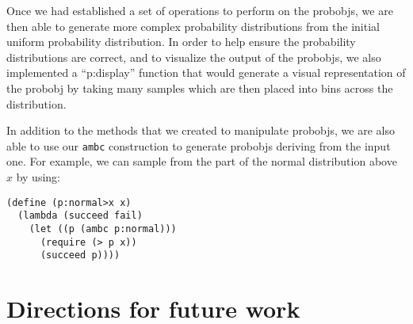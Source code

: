 \documentclass{article}
\begin{document}
Once we had established a set of operations to perform on the
{probobj}s, we are then able to generate more complex probability
distributions from the initial uniform probability distribution. In order to
help ensure the probability distributions are correct, and to visualize the
output of the {probobj}s, we also implemented a ``p:display'' function
that would generate a visual representation of the {probobj} by taking
many samples which are then placed into bins across the distribution.

In addition to the methods that we created to manipulate {probobj}s, we
are also able to use our \texttt{ambc} construction to generate
{probobj}s deriving from the input one. For example, we can sample from
the part of the normal distribution above $x$ by using:

\begin{lstlisting}
(define (p:normal>x x)
  (lambda (succeed fail)
    (let ((p (ambc p:normal)))
      (require (> p x))
      (succeed p))))
\end{lstlisting}

\section{Directions for future work}
\end{document}
